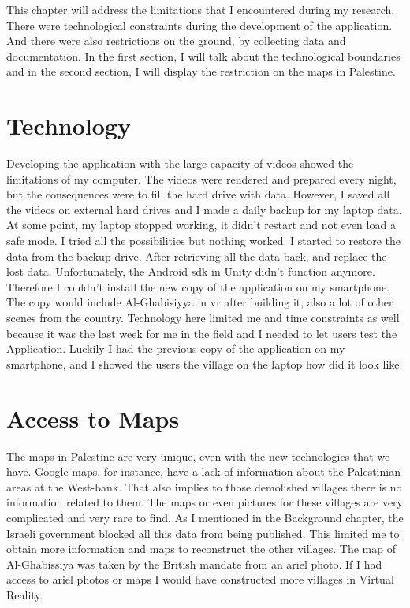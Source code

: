 This chapter will address the limitations that I encountered during my research. There were technological constraints during the development of the application. And there were also restrictions on the ground, by collecting data and documentation. In the first section, I will talk about the technological boundaries and in the second section, I will display the restriction on the maps in Palestine. 
 

\section{Technology}

Developing the application with the large capacity of videos showed the limitations of my computer. The videos were rendered and prepared every night, but the consequences were to fill the hard drive with data. However, I saved all the videos on external hard drives and I made a daily backup for my laptop data.  At some point, my laptop stopped working, it didn't restart and not even load a safe mode. I tried all the possibilities but nothing worked. I started to restore the data from the backup drive. After retrieving all the data back, and replace the lost data. Unfortunately, the Android \acrfull{sdk} in Unity didn't function anymore. Therefore I couldn't install the new copy of the application on my smartphone. The copy would include Al-Ghabisiyya in \acrshort{vr} after building it, also a lot of other scenes from the country. Technology here limited me and time constraints as well because it was the last week for me in the field and I needed to let users test the Application. Luckily I had the previous copy of the application on my smartphone, and I showed the users the village on the laptop how did it look like. 
   

\section{Access to Maps}

The maps in Palestine are very unique, even with the new technologies that we have. Google maps, for instance, have a lack of information about the Palestinian areas at the West-bank. That also implies to those demolished villages there is no information related to them. The maps or even pictures for these villages are very complicated and very rare to find. As I mentioned in the Background chapter, the Israeli government blocked all this data from being published. This limited me to obtain more information and maps to reconstruct the other villages. The map of Al-Ghabissiya was taken by the British mandate from an ariel photo. If I had access to ariel photos or maps I would have constructed more villages in Virtual Reality. 